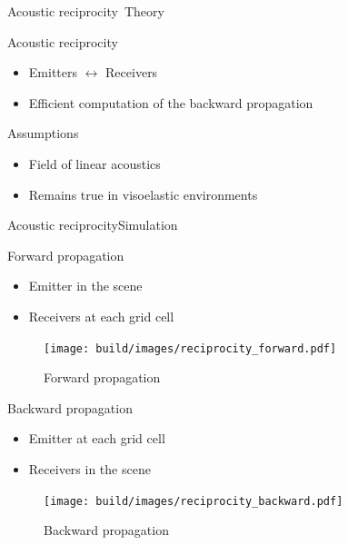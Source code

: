\documentclass[9pt, xcolor={usenames, dvipsnames}]{beamer}
\begin{document}
\begin{frame}{Acoustic reciprocity~}{Theory}
					\hfill
					\begin{minipage}[c]{0.6\textwidth}
						\begin{block}{Acoustic reciprocity}
							\begin{itemize}
								\item Emitters $\leftrightarrow$ Receivers
								\item Efficient computation of the backward propagation
							\end{itemize}
						\end{block}
						\begin{block}{Assumptions}
							\begin{itemize}
								\item Field of linear acoustics
								\item Remains true in visoelastic environments
							\end{itemize}
						\end{block}
					\end{minipage}
				\end{frame}

				\begin{frame}{Acoustic reciprocity}{Simulation}
					\centering
					\begin{minipage}[t]{0.47\textwidth}
						\centering
						\begin{block}{Forward propagation}
							\begin{itemize}
								\item Emitter in the scene
								\item Receivers at each grid cell
							\end{itemize}
						\end{block}
						\begin{figure}
							\texttt{[image: build/images/reciprocity\_forward.pdf]}
							\caption{Forward propagation}
						\end{figure}
					\end{minipage}
					\hfill
					\begin{minipage}[t]{0.47\textwidth}
						\centering
						\begin{block}{Backward propagation}
							\begin{itemize}
								\item Emitter at each grid cell
								\item Receivers in the scene
							\end{itemize}
						\end{block}
						\begin{figure}
							\texttt{[image: build/images/reciprocity\_backward.pdf]}
							\caption{Backward propagation}
						\end{figure}
					\end{minipage}
				\end{frame}
\end{document}
